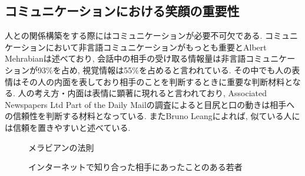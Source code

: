\subsection{コミュニケーションにおける笑顔の重要性}
人との関係構築をする際にはコミュニケーションが必要不可欠である. コミュニケーションにおいて非言語コミュニケーションがもっとも重要とAlbert Mehrabian\cite{rule_of_Mehrabian}は述べており, 会話中の相手の受け取る情報量は非言語コミュニケーションが93\%を占め, 視覚情報は55\%を占めると言われている. その中でも人の表情はその人の内面を表しており相手のことを判断するときに重要な判断材料となる.
人の考え方・内面は表情に顕著に現れると言われており, Associated Newspapers Ltd Part of the Daily Mailの調査によると目尻と口の動きは相手への信頼性を判断する材料となっている.\cite{TheMailonSunday}
またBruno Leangによれば, 似ている人には信頼を置きやすいと述べている.\cite{Bruno}

\begin{figure}[htbp]
    \begin{center}
    \end{center}
    \caption{メラビアンの法則}
    \label{fig:mehrabian}
\end{figure}


\begin{figure}[htbp]
    \begin{center}
    \end{center}
    \caption{インターネットで知り合った相手にあったことのある若者}
    \label{fig:onlinemeeting_to_real}
\end{figure}



